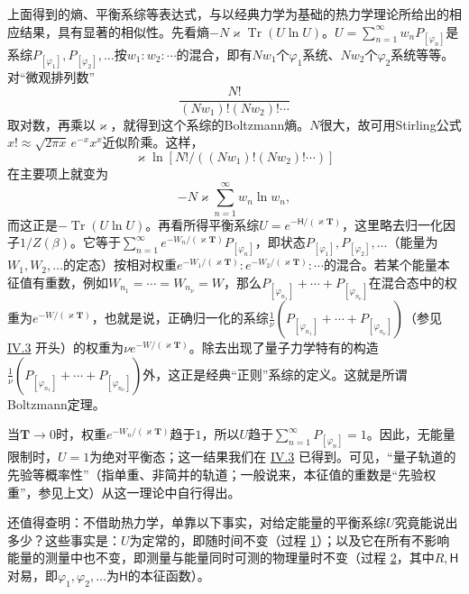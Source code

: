 \documentclass[fontsize=13pt,twoside,openany,headings=normal,parskip=false,bookmarkpackage=false,DIV=calc]{scrbook}
\newcommand{\textkaishu}[1]{{\zhkaishu #1}}
\begin{document}
上面得到的熵、平衡系综等表达式，与以经典力学为基础的热力学理论所给出的相应结果，具有显著的相似性。先看熵$-N\varkappa\operatorname{Tr}(U\ln U)$。$U=\sum_{n=1}^{\infty}w_nP_{[\varphi_n]}$是系综$P_{[\varphi_1]},\allowbreak P_{[\varphi_2]},\allowbreak \ldots$按$w_1:w_2:\cdots$的混合，即有$Nw_1$个$\varphi_1$系统、$Nw_2$个$\varphi_2$系统等等。对“微观排列数”
\[
\frac{N!}{(Nw_1)!(Nw_2)!\cdots}
\]
取对数，再乘以$\varkappa$，就得到这个系综的Boltzmann熵。$N$很大，故可用Stirling公式$x!\approx\sqrt{2\pi x}\,e^{-x}x^x$近似阶乘。这样，
\[
\varkappa\ln[N!/((Nw_1)!(Nw_2)!\cdots)]
\]
在主要项上就变为
\[
-N\varkappa\sum_{n=1}^{\infty}w_n\ln w_n,
\]
而这正是$-\operatorname{Tr}(U\ln U)$。\hypertarget{origpage-211}{}\label{origpage-211}再看所得平衡系综$U=e^{-\mathsf{H}/(\varkappa\mathbf T)}$，这里略去归一化因子$1/Z(\beta)$。它等于$\sum_{n=1}^{\infty}e^{-W_n/(\varkappa\mathbf T)}P_{[\varphi_n]}$，即状态$P_{[\varphi_1]},\allowbreak P_{[\varphi_2]},\allowbreak \ldots$（能量为$W_1,\allowbreak W_2,\allowbreak \ldots$的定态）按相对权重$e^{-W_1/(\varkappa\mathbf T)}:e^{-W_2/(\varkappa\mathbf T)}:\cdots$的混合。若某个能量本征值有重数，例如$W_{n_1}=\cdots=W_{n_\nu}=W$，那么$P_{[\varphi_{n_1}]}+\cdots+P_{[\varphi_{n_\nu}]}$在混合态中的权重为$e^{-W/(\varkappa\mathbf T)}$，也就是说，正确归一化的系综$\frac1\nu(P_{[\varphi_{n_1}]}+\cdots+P_{[\varphi_{n_\nu}]})$（参见 \hyperref[sec:IV.3]{IV.3} 开头）的权重为$\nu e^{-W/(\varkappa\mathbf T)}$。除去出现了量子力学特有的构造$\frac1\nu(P_{[\varphi_{n_1}]}+\cdots+P_{[\varphi_{n_\nu}]})$外，这正是经典“正则”系综的定义。这就是所谓Boltzmann定理。

当$\mathbf T\to0$时，权重$e^{-W_n/(\varkappa\mathbf T)}$趋于$1$，所以$U$趋于$\sum_{n=1}^{\infty}P_{[\varphi_n]}=1$。因此，无能量限制时，$U=1$为绝对平衡态；这一结果我们在 \hyperref[sec:IV.3]{IV.3} 已得到。可见，“\textkaishu{量子轨道的先验等概率性}”（指单重、非简并的轨道；一般说来，本征值的重数是“先验权重”，参见上文）从这一理论中自行得出。

还值得查明：不借助热力学，单靠以下事实，对给定能量的平衡系综$U$究竟能说出多少？这些事实是：$U$为定常的，即随时间不变（过程 \hyperref[eq:V.1.1]{1}）；以及它在所有不影响能量的测量中也不变，即测量与能量同时可测的物理量时不变（过程 \hyperref[eq:V.1.2]{2}，其中$R,\allowbreak \mathsf{H}$对易，即$\varphi_1,\allowbreak \varphi_2,\allowbreak \ldots$为$\mathsf{H}$的本征函数）。
\end{document}
